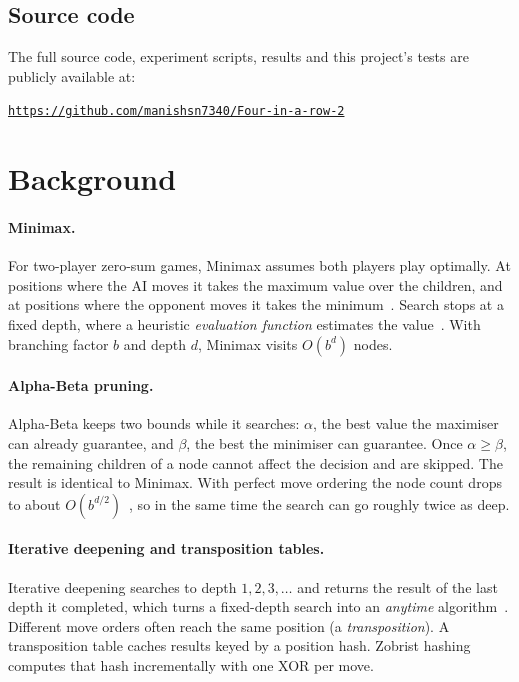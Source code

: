 \documentclass[11pt,a4paper]{article}
\newcommand{\repourl}{https://github.com/manishsn7340/Four-in-a-row-2}
\begin{document}
\subsection{Source code}
The full source code, experiment scripts, results and this project's tests are publicly available at:
\begin{center}
\begin{tcolorbox}[enhanced,colback=white,colframe=violet,boxrule=0.8pt,arc=3pt,width=0.8\textwidth,halign=center]
\href{\repourl}{\large\texttt{\repourl}}
\end{tcolorbox}
\end{center}

\section{Background}\label{sec:background}

\paragraph{Minimax.} For two-player zero-sum games, Minimax assumes both players play optimally. At positions where the AI moves it takes the maximum value over the children, and at positions where the opponent moves it takes the minimum~\cite{aima}. Search stops at a fixed depth, where a heuristic \emph{evaluation function} estimates the value~\cite{shannon1950}. With branching factor $b$ and depth $d$, Minimax visits $O(b^d)$ nodes.

\paragraph{Alpha-Beta pruning.} Alpha-Beta keeps two bounds while it searches: $\alpha$, the best value the maximiser can already guarantee, and $\beta$, the best the minimiser can guarantee. Once $\alpha \ge \beta$, the remaining children of a node cannot affect the decision and are skipped. The result is identical to Minimax. With perfect move ordering the node count drops to about $O(b^{d/2})$~\cite{knuth1975}, so in the same time the search can go roughly twice as deep.

\paragraph{Iterative deepening and transposition tables.} Iterative deepening searches to depth $1, 2, 3, \dots$ and returns the result of the last depth it completed, which turns a fixed-depth search into an \emph{anytime} algorithm~\cite{korf1985}. Different move orders often reach the same position (a \emph{transposition}). A transposition table caches results keyed by a position hash. Zobrist hashing~\cite{zobrist1970} computes that hash incrementally with one XOR per move.
\end{document}
